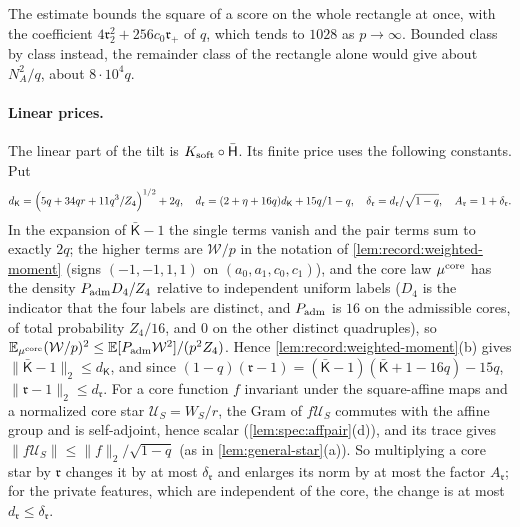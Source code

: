 The estimate bounds the square of a score on the whole rectangle at once,
with the coefficient $4\mathfrak r_2^2+256c_0\mathfrak r_+$ of $q$, which tends to
$1028$ as $p\to\infty$. Bounded class by class instead, the remainder class
of the rectangle alone would give about $N_A^2/q$, about $8\cdot10^4q$.

\paragraph{Linear prices.}
The linear part of the tilt is $K_{\rm soft}\circ\Hbar$. Its finite price uses the
following constants. Put
\[
 d_{\mathsf K}=\Bigl(\frac{5q+34qr+11q^3}{Z_4}\Bigr)^{1/2}+2q,\quad
 d_{\mathfrak r}=\frac{(2+\eta+16q)d_{\mathsf K}+15q}{1-q},\quad
 \delta_{\mathfrak r}=\frac{d_{\mathfrak r}}{\sqrt{1-q}},\quad
 A_{\mathfrak r}=1+\delta_{\mathfrak r}.
\]
In the expansion of $\bar{\mathsf K}-1$ the single terms vanish and the pair terms sum to
exactly $2q$; the higher terms are $\mathcal W/p$ in the notation of
\cref{lem:record:weighted-moment} (signs $(-1,-1,1,1)$ on $(a_0,a_1,c_0,c_1)$), and the core
law $\mu^{\rm core}$ has the density $P_{\rm adm}D_4/Z_4$ relative to independent uniform
labels ($D_4$ is the indicator that the four labels are distinct, and $P_{\rm adm}$ is $16$
on the admissible cores, of total probability $Z_4/16$, and $0$ on the other distinct
quadruples), so
$\E_{\mu^{\rm core}}(\mathcal W/p)^2\le\E[P_{\rm adm}\mathcal W^2]/(p^2Z_4)$. Hence
\cref{lem:record:weighted-moment}(b) gives $\|\bar{\mathsf K}-1\|_2\le d_{\mathsf K}$, and since
$(1-q)(\mathfrak r-1)=(\bar{\mathsf K}-1)(\bar{\mathsf K}+1-16q)-15q$,
$\|\mathfrak r-1\|_2\le d_{\mathfrak r}$. For a core function $f$ invariant under the
square-affine maps and a normalized core star $\mathcal U_S=W_S/r$, the Gram of
$f\mathcal U_S$ commutes with the affine group and is self-adjoint, hence scalar
(\cref{lem:spec:affpair}(d)), and its trace gives $\|f\mathcal U_S\|\le\|f\|_2/\sqrt{1-q}$
(as in \cref{lem:general-star}(a)). So multiplying a core star by $\mathfrak r$ changes it
by at most $\delta_{\mathfrak r}$ and enlarges its norm by at most the factor
$A_{\mathfrak r}$; for the private features, which are independent of the core, the change
is at most $d_{\mathfrak r}\le\delta_{\mathfrak r}$.

